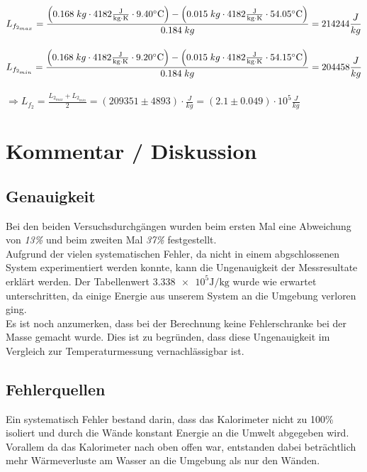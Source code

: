 \documentclass[a4paper,12pt]{article}
\begin{document}
$L_{f_{2_{max}}} =\displaystyle{\frac{\left(0.168\;kg \cdot 4182\rm{\frac{J}{kg \cdot K}}\cdot 9.40^{\circ}C \right)-\left(0.015\;kg\cdot 4182 \rm{\frac{J}{kg \cdot K}} \cdot 54.05^{\circ}C\right)}{0.184\;kg}} = 214244\frac{J}{kg}$\\\\

$L_{f_{2_{min}}} =\displaystyle{\frac{\left(0.168\;kg \cdot 4182\rm{\frac{J}{kg \cdot K}}\cdot 9.20^{\circ}C \right)-\left(0.015\;kg\cdot 4182 \rm{\frac{J}{kg \cdot K}} \cdot 54.15^{\circ}C\right)}{0.184\;kg}} = 204458\frac{J}{kg}$\\\\

$\Rightarrow L_{f_2}=\displaystyle{\frac{L_{2_{max}}+L_{2_{min}}}{2}=\left(209351\pm 4893\right) \cdot \frac{J}{kg}=\left(2.1\pm 0.049\right)\cdot 10^{5} \frac{J}{kg}}$

\newpage
\section{Kommentar / Diskussion}

\subsection{Genauigkeit}
Bei den beiden Versuchsdurchgängen wurden beim ersten Mal eine Abweichung von \textit{13\%} und beim zweiten Mal \textit{37\%} festgestellt.\\

Aufgrund der vielen systematischen Fehler, da nicht in einem abgschlossenen System experimentiert werden konnte, kann die Ungenauigkeit der Messresultate erklärt werden. Der Tabellenwert $\num{3.338 e5}\si{\J\per\kg}$ \cite{formelsammlung} wurde wie erwartet unterschritten, da einige Energie aus unserem System an die Umgebung verloren ging.\\

Es ist noch anzumerken, dass bei der Berechnung keine Fehlerschranke bei der Masse gemacht wurde. Dies ist zu begründen, dass diese Ungenauigkeit im Vergleich zur Temperaturmessung vernachlässigbar ist.

\subsection{Fehlerquellen}

Ein systematisch Fehler bestand darin, dass das Kalorimeter nicht zu 100\% isoliert und durch die Wände konstant Energie an die Umwelt abgegeben wird. Vorallem da das Kalorimeter nach oben offen war, entstanden dabei beträchtlich mehr Wärmeverluste am Wasser an die Umgebung als nur den Wänden.\\
\end{document}
